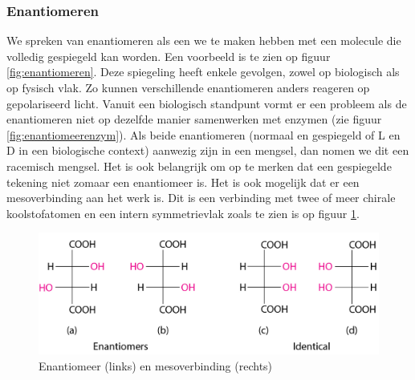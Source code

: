 \documentclass[a4paper,kul]{kulakarticle} %
\begin{document}
\subsubsection{Enantiomeren}
We spreken van enantiomeren als een we te maken hebben met een molecule die volledig gespiegeld kan worden. Een voorbeeld is te zien op figuur \ref{fig:enantiomeren}. Deze spiegeling heeft enkele gevolgen, zowel op biologisch als op fysisch vlak. Zo kunnen verschillende enantiomeren anders reageren op gepolariseerd licht. Vanuit een biologisch standpunt vormt er een probleem als de enantiomeren niet op dezelfde manier samenwerken met enzymen (zie figuur \ref{fig:enantiomeerenzym}). Als beide enantiomeren (normaal en gespiegeld of L en D in een biologische context) aanwezig zijn in een mengsel, dan nomen we dit een racemisch mengsel.
Het is ook belangrijk om op te merken dat een gespiegelde tekening niet zomaar een enantiomeer is. Het is ook mogelijk dat er een mesoverbinding aan het werk is. Dit is een verbinding met twee of meer chirale koolstofatomen en een intern symmetrievlak zoals te zien is op figuur \ref{fig:mesoverbinding}. 
\begin{figure}
	\centering
	\includegraphics[width=0.7\linewidth]{mesoverbinding}
	\caption[Mesoverbinding]{Enantiomeer (links) en mesoverbinding (rechts)}
	\label{fig:mesoverbinding}
\end{figure}
\end{document}
